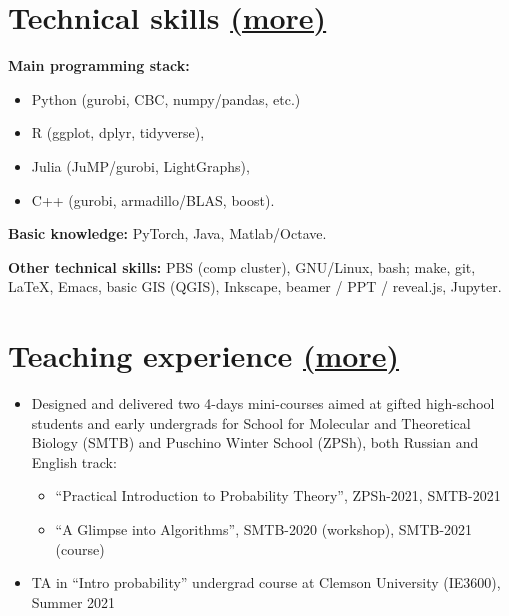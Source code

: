 \documentclass[11pt]{article} \usepackage{geometry} %
\newcommand{\mhref}[1]{\hfill\href{#1}{\small (more\faExternalLink*)}}
\begin{document}
\begin{minipage}[t]{0.49\textwidth}
   \section*{Technical skills \mhref{https://www.bochkarev.io/notes/stack/}}
   \textbf{Main programming stack:}
   \begin{itemize}
     \itemsep0pt
   \item Python (gurobi, CBC, numpy/pandas, etc.)
     \item R (ggplot, dplyr, tidyverse),
     \item Julia (JuMP/gurobi, LightGraphs),
     \item C++ (gurobi, armadillo/BLAS, boost).
   \end{itemize}\vspace{0.5em}
   \textbf{Basic knowledge:} PyTorch, Java, Matlab/Octave. \vspace{1em}

   \textbf{Other technical skills:}
   PBS (comp cluster), GNU/Linux, bash; make, git, \LaTeX, Emacs, basic GIS
   (QGIS), Inkscape, beamer / PPT / reveal.js, Jupyter.
   \end{minipage}

   \section*{Teaching experience \mhref{https://www.bochkarev.io/teaching/}}
   \begin{itemize}
     \itemsep0pt
      \item Designed and delivered two 4-days mini-courses aimed at gifted
      high-school students and early undergrads for School for Molecular and
      Theoretical Biology (SMTB) and Puschino Winter School (ZPSh), both Russian
      and English track:
      \begin{itemize}
        \itemsep0pt
        \item ``Practical Introduction to Probability Theory'', ZPSh-2021,
          SMTB-2021
        \item ``A Glimpse into Algorithms'', SMTB-2020 (workshop), SMTB-2021 (course)
      \end{itemize}
      \item TA in ``Intro probability'' undergrad course at Clemson University
        (IE3600), Summer 2021 \vspace{0.3em}
\end{itemize}
\end{document}
